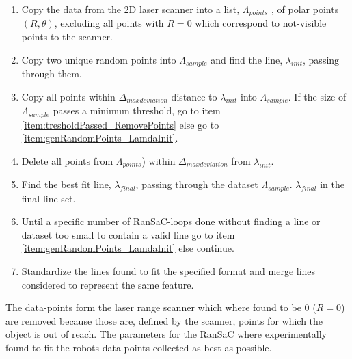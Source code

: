 \begin{enumerate}
\item Copy the data from the 2D laser scanner into a list, $ \Lambda_{points} $ ,
of polar points $ (R,\theta) $, excluding all points with $ R = 0 $ which correspond to not-visible points to the scanner.
\item Copy two unique random points into $ \Lambda_{sample} $ and find the line, $ \lambda_{init} $, passing through them. \label{item:genRandomPoints_LamdaInit}
\item Copy all points within $ \Delta_{max deviation} $ distance to $ \lambda_{init} $ into $ \Lambda_{sample} $.
If the size of $ \Lambda_{sample} $ passes a minimum threshold,
go to item \ref{item:tresholdPassed_RemovePoints}
else go to \ref{item:genRandomPoints_LamdaInit}.
\item Delete all points from $ \Lambda_{points} $) within $ \Delta_{max deviation} $ from $ \lambda_{init} $.
\label{item:tresholdPassed_RemovePoints}
\item Find the best fit line, $ \lambda_{final} $,
passing through the dataset $ \Lambda_{sample} $. $ \lambda_{final} $ in the final line set.
\item Until a specific number of RanSaC-loops done without finding a line
or dataset too small to contain a valid line go to item \ref{item:genRandomPoints_LamdaInit} else continue.
\item Standardize the lines found to fit the specified format and merge lines considered to represent the same feature.
\end{enumerate}

The data-points form the laser range scanner which where found to be 0 ($ R = 0 $)
are removed because those are, defined by the scanner, points for which the object is out of reach.
The parameters for the RanSaC where experimentally found to fit the robots data points collected as best as possible.
